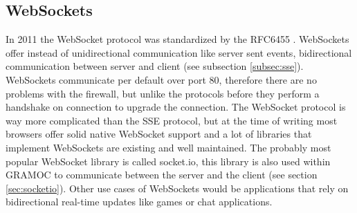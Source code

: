 \subsection{WebSockets}
In 2011 the WebSocket protocol was standardized by the RFC6455 \autocite{rfc6455}. WebSockets offer instead of unidirectional communication like server sent events, bidirectional communication between server and client (see subsection \vref{subsec:sse}). WebSockets communicate per default over port 80, therefore there are no problems with the firewall, but unlike the protocols before they perform a handshake on connection to upgrade the connection. The WebSocket protocol is way more complicated than the SSE protocol, but at the time of writing most browsers offer solid native WebSocket support and a lot of libraries that implement WebSockets are existing and well maintained. The probably most popular WebSocket library is called socket.io, this library is also used within GRAMOC to communicate between the server and the client (see section \vref{sec:socketio}). Other use cases of WebSockets would be applications that rely on bidirectional real-time updates like games or chat applications.
